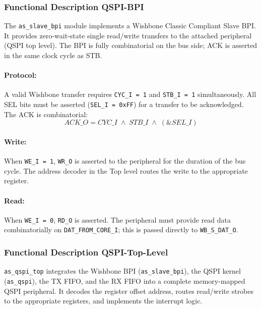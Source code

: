 \subsubsection{Functional Description QSPI-BPI}

The \texttt{as\_slave\_bpi} module implements a Wishbone Classic Compliant Slave
BPI. It provides zero-wait-state single read/write transfers to the attached
peripheral (QSPI top level). The BPI is fully combinatorial on the bus side;
ACK is asserted in the same clock cycle as STB.

\paragraph{Protocol:}
A valid Wishbone transfer requires \texttt{CYC\_I = 1} and \texttt{STB\_I = 1}
simultaneously. All SEL bits must be asserted (\texttt{SEL\_I = 0xFF}) for a
transfer to be acknowledged. The ACK is combinatorial:
\[
  ACK\_O = CYC\_I \;\land\; STB\_I \;\land\; (\&SEL\_I)
\]

\paragraph{Write:}
When \texttt{WE\_I = 1}, \texttt{WR\_O} is asserted to the peripheral for the
duration of the bus cycle. The address decoder in the Top level routes the write
to the appropriate register.

\paragraph{Read:}
When \texttt{WE\_I = 0}, \texttt{RD\_O} is asserted. The peripheral must provide
read data combinatorially on \texttt{DAT\_FROM\_CORE\_I}; this is passed
directly to \texttt{WB\_S\_DAT\_O}.

\subsubsection{Functional Description QSPI-Top-Level}

\texttt{as\_qspi\_top} integrates the Wishbone BPI (\texttt{as\_slave\_bpi}),
the QSPI kernel (\texttt{as\_qspi}), the TX FIFO, and the RX FIFO into a
complete memory-mapped QSPI peripheral. It decodes the register offset address,
routes read/write strobes to the appropriate registers, and implements the
interrupt logic.

